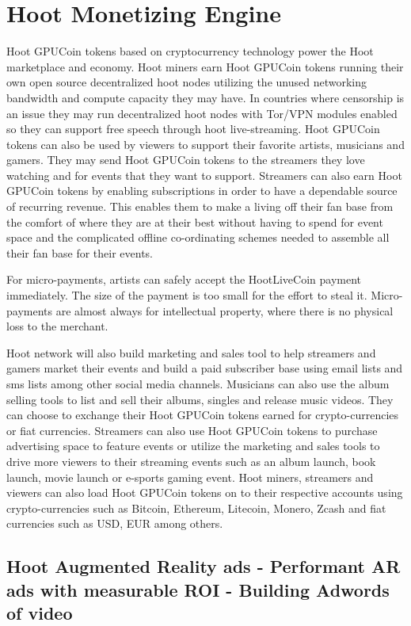 \documentclass{article}
\begin{document}
\section{Hoot Monetizing Engine}
Hoot GPUCoin tokens based on cryptocurrency technology power the Hoot marketplace and economy. Hoot miners earn Hoot GPUCoin tokens running their own open source decentralized hoot nodes utilizing the unused networking bandwidth and compute capacity they may have. In countries where censorship is an issue they may run decentralized hoot nodes with Tor/VPN modules enabled so they can support free speech through hoot live-streaming. Hoot GPUCoin tokens can also be used by viewers to support their favorite artists, musicians and gamers. They may send Hoot GPUCoin tokens to the streamers they love watching and for events that they want to support. Streamers can also earn Hoot GPUCoin tokens by enabling subscriptions in order to have a dependable source of recurring revenue. This enables them to make a living off their fan base from the comfort of where they are at their best without having to spend for event space and the complicated offline co-ordinating schemes needed to assemble all their fan base for their events.

For micro-payments, artists can safely accept the HootLiveCoin payment immediately. The size of the payment is too small for the effort to steal it. Micro-payments are almost always for intellectual property, where there is no physical loss to the merchant.

 Hoot network will also build marketing and sales tool to help streamers and gamers market their events and build a paid subscriber base using email lists and sms lists among other social media channels. 
Musicians can also use the album selling tools to list and sell their albums, singles and release music videos. They can choose to exchange their Hoot GPUCoin tokens earned for crypto-currencies or fiat currencies.
 Streamers can also use Hoot GPUCoin tokens to purchase advertising space to feature events or utilize the marketing and sales tools to drive more viewers to their streaming events such as an album launch, book launch, movie launch or e-sports gaming event. Hoot miners, streamers and viewers can also load Hoot GPUCoin tokens on to their respective accounts using crypto-currencies such as Bitcoin, Ethereum, Litecoin, Monero, Zcash and fiat currencies such as USD, EUR among others.

\subsection{Hoot Augmented Reality ads - Performant AR ads with
 measurable ROI - Building Adwords of video }
\end{document}
